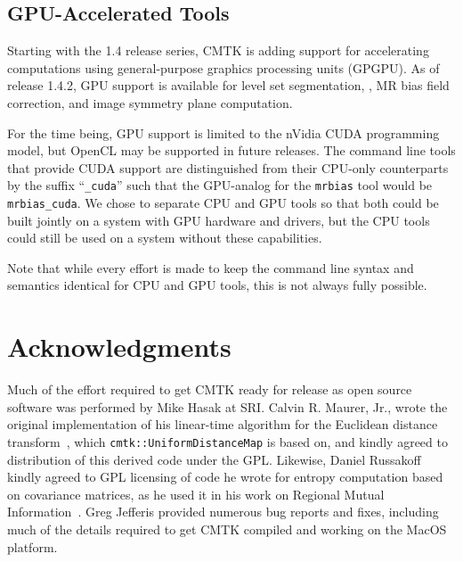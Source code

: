 \documentclass{InsightArticle}
\begin{document}

\subsection{GPU-Accelerated Tools}

Starting with the 1.4 release series, CMTK is adding support for accelerating
computations using general-purpose graphics processing units (GPGPU). As of
release 1.4.2, GPU support is available for level set segmentation,
, MR bias field correction, and image symmetry
plane computation.

For the time being, GPU support is limited to the nVidia CUDA programming
model, but OpenCL may be supported in future releases. 
 The command line tools that provide CUDA support are
distinguished from their CPU-only counterparts by the suffix ``{\tt \_cuda}''
such that the GPU-analog for the {\tt mrbias} tool would be {\tt
  mrbias\_cuda}. We chose to separate CPU and GPU tools so that both could be
built jointly on a system with GPU hardware and drivers, but the CPU tools
could still be used on a system without these capabilities.

Note that while every effort is made to keep the command line syntax and
semantics identical for CPU and GPU tools, this is not always fully possible.

\clearpage
\section*{Acknowledgments}

Much of the effort required to get CMTK ready for release as open source
software was performed by Mike Hasak at SRI. Calvin R. Maurer, Jr., wrote the
original implementation of his linear-time algorithm for the Euclidean
distance transform~\cite{MaurQiRagh:2003}, which
\verb|cmtk::UniformDistanceMap| is based on, and kindly agreed to distribution
of this derived code under the GPL. Likewise, Daniel Russakoff kindly agreed
to GPL licensing of code he wrote for entropy computation based on covariance
matrices, as he used it in his work on Regional Mutual
Information~\cite{RussTomaRohl:2004}. Greg Jefferis provided numerous bug
reports and fixes, including much of the details required to get CMTK compiled
and working on the MacOS platform.

%
%




\printindex
\end{document}
